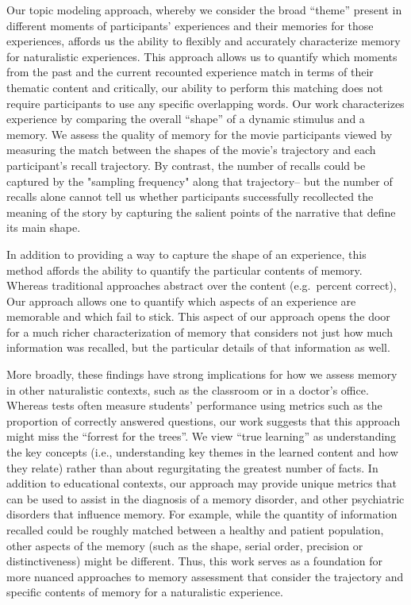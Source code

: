 \documentclass{article}
\begin{document}
Our topic modeling approach, whereby we consider the broad ``theme'' present in different moments of participants' experiences and their memories for those experiences, affords us the ability to flexibly and accurately characterize memory for naturalistic experiences. This approach allows us to quantify which moments from the past and the current recounted experience match in terms of their thematic content and critically, our ability to perform this matching does not require participants to use any specific overlapping words. Our work characterizes experience by comparing the overall ``shape'' of a dynamic stimulus and a memory. We assess the quality of memory for the movie participants viewed by measuring the match between the shapes of the movie's trajectory and each participant's recall trajectory. By contrast, the number of recalls could be captured by the "sampling frequency" along that trajectory-- but the number of recalls alone cannot tell us whether participants successfully recollected the meaning of the story by capturing the salient points of the narrative that define its main shape.

In addition to providing a way to capture the shape of an experience, this method affords the ability to quantify the particular contents of memory.  Whereas traditional approaches abstract over the content (e.g.\ percent correct), Our approach allows one to quantify which aspects of an experience are memorable and which fail to stick. This aspect of our approach opens the door for a much richer characterization of memory that considers not just how much information was recalled, but the particular details of that information as well.

More broadly, these findings have strong implications for how we assess memory in other naturalistic contexts, such as the classroom or in a doctor's office.  Whereas tests often measure students' performance using metrics such as the proportion of correctly answered questions, our work suggests that this approach might miss the ``forrest for the trees''. We view ``true learning'' as understanding the key concepts (i.e., understanding key themes in the learned content and how they relate) rather than about regurgitating the greatest number of facts. In addition to educational contexts, our approach may provide unique metrics that can be used to assist in the diagnosis of a memory disorder, and other psychiatric disorders that influence memory. For example, while the quantity of information recalled could be roughly matched between a healthy and patient population, other aspects of the memory (such as the shape, serial order, precision or distinctiveness) might be different. Thus, this work serves as a foundation for more nuanced approaches to memory assessment that consider the trajectory and specific contents of memory for a naturalistic experience.
\end{document}
